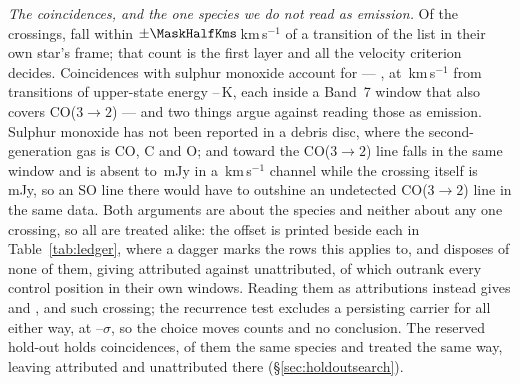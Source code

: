 \begin{table}
\centering
\footnotesize
\caption{The line mask, by species: the number of transitions $N$ it holds,
the frequency range they span inside the searched intervals and their
upper-state energies. Hydrogen recombination lines carry no tabulated
$E_{\rm u}$. The criterion and the dated query above define the list
exactly, so the individual transitions can be recovered from the line
catalogues themselves.}
\label{tab:masklines}

\end{table}

\emph{The coincidences, and the one species we do not read as emission.} Of
the \NCross{} crossings, \MkNCoinc{} fall within
$\pm\MaskHalfKms$\,km\,s$^{-1}$ of a transition of the list in their own
star's frame; that count is the first layer and all the velocity criterion
decides. Coincidences with sulphur monoxide account for \MkNSODecide{} ---
\MkSOStars, at \MkSODvList\,km\,s$^{-1}$ from transitions of upper-state
energy \MkSOEuLo--\MkSOEuHi\,K, each inside a Band~7 window that also covers
CO($3\to2$) --- and two things argue against reading those as emission.
Sulphur monoxide has not been reported in a debris disc, where the
second-generation gas is CO, C and O; and toward \FrCpStar{} the CO($3\to2$)
line falls in the same window and is absent to \FrCpCoLimMJy\,mJy in a
\FrCpCoChanKms\,km\,s$^{-1}$ channel while the crossing itself is
\FrCpFluxMJy\,mJy, so an SO line there would have to outshine an undetected
CO($3\to2$) line in the same data. Both arguments are about the species and
neither about any one crossing, so all \MkNSODecide{} are treated alike: the
offset is printed beside each in Table~\ref{tab:ledger}, where a dagger marks
the rows this applies to, and disposes of none of them, giving
\MkAttr{} attributed against \MkUnattr{} unattributed, of
which \MkRankLeadWord{} outrank every control position in their own windows.
Reading them as attributions instead gives \MkAttrAlt{} and \MkUnattrAlt,
and \MkRankLeadAlt{} such crossing; the recurrence test excludes a persisting
carrier for all \MkNSODecide{} either way, at
\MkAttrExclLo--\MkAttrExclHi$\sigma$, so the choice moves counts and no
conclusion. The reserved hold-out holds \HoNCoinc{} coincidences,
\HoNNoted{} of them the same species and treated the same way, leaving
\HoNAttr{} attributed and \HoNUnattr{} unattributed there
(\S\ref{sec:holdoutsearch}).

